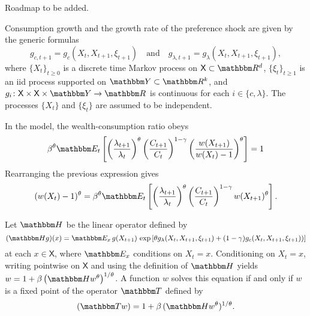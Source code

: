 \documentclass[12pt, reqno]{amsart}
\renewcommand{\geq}{\geqslant}
\newcommand{\1}{\mathbbm 1}
\newcommand{\RR}{\mathbbm R}
\newcommand{\TT}{\mathbbm T}
\newcommand{\YY}{\mathbbm Y}
\newcommand{\HH}{\mathbbm H}
\newcommand{\EE}{\mathbbm E}
\newcommand{\XX}{\mathsf X}
\theoremstyle{plain}
\theoremstyle{definition}
\begin{document}
Roadmap to be added.

Consumption growth and the growth rate of the preference shock are given by
the generic formulas
%
\begin{equation}
    \label{eq:kappa}
    g_{c, t+1}
    = g_c(X_t, X_{t+1}, \xi_{t+1})
    \quad \text{and} \quad
    g_{\lambda, t+1}
    = g_\lambda(X_t, X_{t+1}, \xi_{t+1}),
\end{equation}
%
where $\{ X_t \}_{t \geq 0}$ is a discrete time Markov process on $\XX \subset \RR^d$, $\{
\xi_t \}_{t \geq 1}$ is an {\sc iid} process supported on $\YY \subset \RR^k$,
and $g_i \colon \XX \times \XX \times \YY \to \RR$ is continuous for
each $i \in \{c, \lambda\}$.  The processes $\{X_t\}$  and $\{\xi_t\}$ are
assumed to be independent.




In the model, the wealth-consumption ratio obeys
%
\begin{equation*}
    \beta^{\theta}
    \EE_t
    \left[
    \left( \frac{\lambda_{t+1}}{\lambda_t} \right)^\theta
        \left( \frac{C_{t+1}}{C_t} \right)^{1-\gamma}
        \left( \frac{w(X_{t+1})}{w(X_t)-1} \right)^\theta
    \right] = 1
\end{equation*}
%
Rearranging the previous expression gives
%
\begin{equation*}
    (w(X_t)-1)^\theta
    = \beta^{\theta}
    \EE_t
    \left[
    \left( \frac{\lambda_{t+1}}{\lambda_t} \right)^\theta
        \left( \frac{C_{t+1}}{C_t} \right)^{1-\gamma}
        w(X_{t+1})^\theta
    \right].
\end{equation*}
%

Let $\HH$ be the linear operator defined by
%
\begin{equation}\label{eq:defk}
    (\HH g)(x) = \EE_x 
        \, g(X_{t+1})  \,
        \exp
        \left[ 
            \theta g_\lambda(X_t, X_{t+1}, \xi_{t+1}) + (1-\gamma) g_c(X_t, X_{t+1}, \xi_{t+1}))
        \right]
\end{equation}
%
at each $x \in \XX$,  where $\EE_x$ conditions on $X_t = x$.
Conditioning on $X_t = x$, writing pointwise on $\XX$ and using the definition
of $\HH$ yields $w = 1 + \beta \left( \HH w^\theta \right)^{1/\theta}$.  A
function $w$ solves this equation if and only if $w$ is a fixed point
of the operator $\TT$ defined by 
%
\begin{equation}\label{eq:wcop}
    (\TT w) = 1 + \beta \,  (\HH w^\theta)^{1/\theta}.
\end{equation}
%
\end{document}
